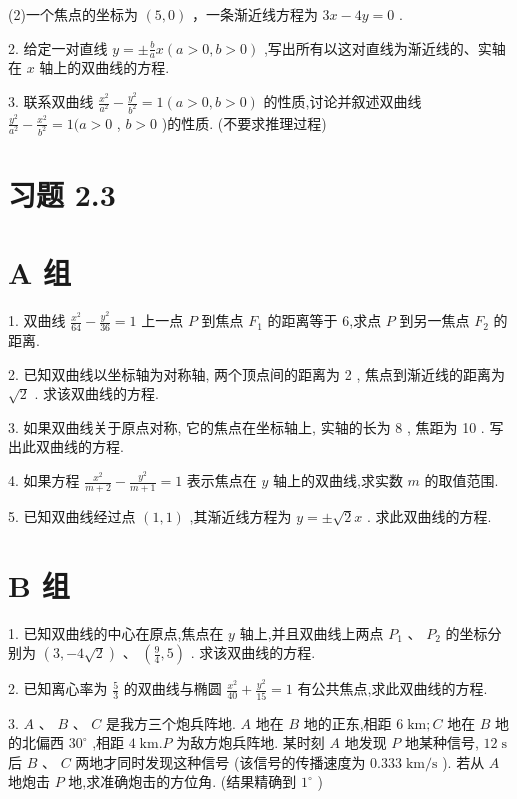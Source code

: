 \documentclass[10pt]{article}
\begin{document}
(2)一个焦点的坐标为 \(\left( {5,0}\right)\) ，一条渐近线方程为 \({3x} - {4y} = 0\) .

2. 给定一对直线 \(y =  \pm  \frac{b}{a}x\left( {a > 0,b > 0}\right)\) ,写出所有以这对直线为渐近线的、实轴在 \(x\) 轴上的双曲线的方程.

3. 联系双曲线 \(\frac{{x}^{2}}{{a}^{2}} - \frac{{y}^{2}}{{b}^{2}} = 1\left( {a > 0,b > 0}\right)\) 的性质,讨论并叙述双曲线 \(\frac{{y}^{2}}{{a}^{2}} - \frac{{x}^{2}}{{b}^{2}} = 1(a > 0\) , \(b > 0\) )的性质. (不要求推理过程)

\section*{习题 2.3}

\section*{A 组}

1. 双曲线 \(\frac{{x}^{2}}{64} - \frac{{y}^{2}}{36} = 1\) 上一点 \(P\) 到焦点 \({F}_{1}\) 的距离等于 6,求点 \(P\) 到另一焦点 \({F}_{2}\) 的距离.

2. 已知双曲线以坐标轴为对称轴, 两个顶点间的距离为 2 , 焦点到渐近线的距离为 \(\sqrt{2}\) . 求该双曲线的方程.

3. 如果双曲线关于原点对称, 它的焦点在坐标轴上, 实轴的长为 8 , 焦距为 10 . 写出此双曲线的方程.

4. 如果方程 \(\frac{{x}^{2}}{m + 2} - \frac{{y}^{2}}{m + 1} = 1\) 表示焦点在 \(y\) 轴上的双曲线,求实数 \(m\) 的取值范围.

5. 已知双曲线经过点 \(\left( {1,1}\right)\) ,其渐近线方程为 \(y =  \pm  \sqrt{2}x\) . 求此双曲线的方程.

\section*{B 组}

1. 已知双曲线的中心在原点,焦点在 \(y\) 轴上,并且双曲线上两点 \({P}_{1}\text{ 、 }{P}_{2}\) 的坐标分别为 \(\left( {3, - 4\sqrt{2}}\right) \text{ 、 }\left( {\frac{9}{4},5}\right)\) . 求该双曲线的方程.

2. 已知离心率为 \(\frac{5}{3}\) 的双曲线与椭圆 \(\frac{{x}^{2}}{40} + \frac{{y}^{2}}{15} = 1\) 有公共焦点,求此双曲线的方程.

3. \(A\text{ 、 }B\text{ 、 }C\) 是我方三个炮兵阵地. \(A\) 地在 \(B\) 地的正东,相距 \(6\mathrm{\;{km}};C\) 地在 \(B\) 地的北偏西 \({30}^{ \circ  }\) ,相距 \(4\mathrm{\;{km}}.P\) 为敌方炮兵阵地. 某时刻 \(A\) 地发现 \(P\) 地某种信号, \({12}\mathrm{\;s}\) 后 \(B\text{ 、 }C\) 两地才同时发现这种信号 (该信号的传播速度为 \({0.333}\mathrm{\;{km}}/\mathrm{s}\) ). 若从 \(A\) 地炮击 \(P\) 地,求准确炮击的方位角. (结果精确到 \({1}^{ \circ  }\) )
\end{document}

